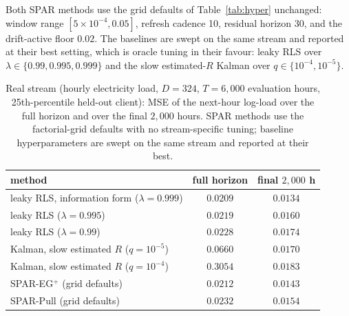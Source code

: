 Both SPAR methods use the grid defaults of Table~\ref{tab:hyper} unchanged: window range $[5 \times 10^{-4}, 0.05]$, refresh cadence 10, residual horizon 30, and the drift-active floor $0.02$.
The baselines are swept on the same stream and reported at their best setting, which is oracle tuning in their favour: leaky RLS over $\lambda \in \{0.99, 0.995, 0.999\}$ and the slow estimated-$R$ Kalman over $q \in \{10^{-4}, 10^{-5}\}$.

\begin{table}[!htbp]
\centering
\footnotesize
\setlength{\tabcolsep}{5pt}
\caption{Real stream (hourly electricity load, $D = 324$, $T = 6{,}000$ evaluation hours, 25th-percentile held-out client): MSE of the next-hour log-load over the full horizon and over the final $2{,}000$ hours.
SPAR methods use the factorial-grid defaults with no stream-specific tuning; baseline hyperparameters are swept on the same stream and reported at their best.}
\label{tab:electricity}
\begin{tabular}{lcc}
\toprule
method & full horizon & final $2{,}000$ h \\
\midrule
leaky RLS, information form ($\lambda = 0.999$) & $\mathbf{0.0209}$ & $\mathbf{0.0134}$ \\
leaky RLS ($\lambda = 0.995$) & $0.0219$ & $0.0160$ \\
leaky RLS ($\lambda = 0.99$) & $0.0228$ & $0.0174$ \\
Kalman, slow estimated $R$ ($q = 10^{-5}$) & $0.0660$ & $0.0170$ \\
Kalman, slow estimated $R$ ($q = 10^{-4}$) & $0.3054$ & $0.0183$ \\
\midrule
SPAR-EG$^+$ (grid defaults) & $0.0212$ & $0.0143$ \\
SPAR-Pull (grid defaults) & $0.0232$ & $0.0154$ \\
\bottomrule
\end{tabular}
\end{table}

